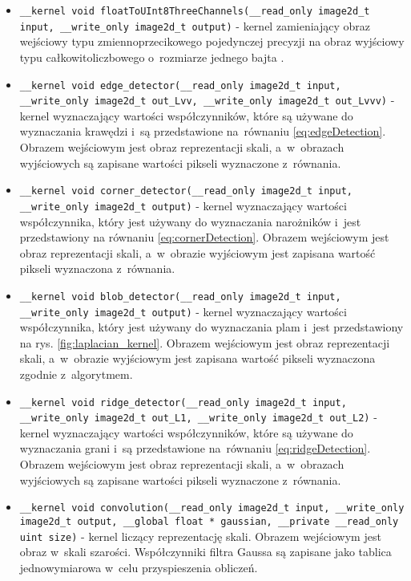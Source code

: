 \begin{itemize}
\item 
\texttt{\_\_kernel void  floatToUInt8ThreeChannels(\_\_read\_only image2d\_t input, \_\_write\_only image2d\_t output)} - kernel zamieniający obraz wejściowy typu zmiennoprzecikowego pojedynczej precyzji na obraz wyjściowy typu całkowitoliczbowego o~rozmiarze jednego bajta .

\item 
\texttt{\_\_kernel void  edge\_detector(\_\_read\_only image2d\_t input, \_\_write\_only image2d\_t out\_Lvv, \_\_write\_only image2d\_t out\_Lvvv)} - kernel wyznaczający wartości współczynników, które są używane do wyznaczania krawędzi i~są przedstawione na~równaniu \eqref{eq:edgeDetection}. Obrazem wejściowym jest obraz reprezentacji skali, a~w~obrazach wyjściowych są zapisane wartości pikseli wyznaczone z~równania.

\item 
\texttt{\_\_kernel void  corner\_detector(\_\_read\_only image2d\_t input, \_\_write\_only image2d\_t output)} - kernel wyznaczający wartości współczynnika, który jest używany do wyznaczania narożników i~jest przedstawiony na równaniu \eqref{eq:cornerDetection}. Obrazem wejściowym jest obraz reprezentacji skali, a~w~obrazie wyjściowym jest zapisana wartość pikseli wyznaczona z~równania.

\item 
\texttt{\_\_kernel void  blob\_detector(\_\_read\_only image2d\_t input, \_\_write\_only image2d\_t output)} - kernel wyznaczający wartości współczynnika, który jest używany do wyznaczania plam i~jest przedstawiony na rys. \ref{fig:laplacian_kernel}. Obrazem wejściowym jest obraz reprezentacji skali, a~w~obrazie wyjściowym jest zapisana wartość pikseli wyznaczona zgodnie z~algorytmem.

\item 
\texttt{\_\_kernel void  ridge\_detector(\_\_read\_only image2d\_t input, \_\_write\_only image2d\_t out\_L1, \_\_write\_only image2d\_t out\_L2)} - kernel wyznaczający wartości współczynników, które są używane do wyznaczania grani i~są przedstawione na~równaniu \eqref{eq:ridgeDetection}. Obrazem wejściowym jest obraz reprezentacji skali, a~w~obrazach wyjściowych są zapisane wartości pikseli wyznaczone z~równania.

\item 
\texttt{\_\_kernel void  convolution(\_\_read\_only image2d\_t input, \_\_write\_only image2d\_t output, \_\_global float * gaussian, \_\_private \_\_read\_only uint size)} - kernel liczący reprezentację skali. Obrazem wejściowym jest obraz w~skali szarości. Współczynniki filtra Gaussa są zapisane jako tablica jednowymiarowa w~celu przyspieszenia obliczeń.

\end{itemize}
